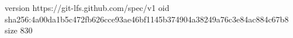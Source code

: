 version https://git-lfs.github.com/spec/v1
oid sha256:4a00da1b5c472fb626cce93ae46bf1145b374904a38249a76c3e84ac884c67b8
size 830
